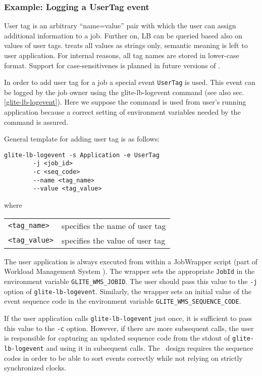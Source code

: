 \subsubsection{Example: Logging a UserTag event}
\label{e:usertag}

User tag is an arbitrary ``name=value'' pair with which the user can assign
additional information to a job. Further on, LB can be queried based also on
values of user tags. \LB treats all values as strings only, semantic meaning
is left to user application. For internal reasons, all tag names are stored 
in lower-case format. Support for case-sensitivenes is planned in future 
versions of \LB.

In order to add user tag for a job a special event \verb'UserTag' is used. This
event can be logged by the job owner using the glite-lb-logevent command (see
also sec.\ref{glite-lb-logevent}). Here we suppose the command is used from
user's running application because a correct setting of environment variables
needed by the command is assured.

General template for adding user tag is as follows:

\begin{verbatim}
glite-lb-logevent -s Application -e UserTag    
        -j <job_id>                         
        -c <seq_code>                       
        --name <tag_name>                   
        --value <tag_value>
\end{verbatim}

where

\begin{tabularx}{\textwidth}{lX}
\texttt{<tag\_name>}  & specifies the name of user tag \\
\texttt{<tag\_value>} & specifies the value of user tag \\
\end{tabularx}

The user application is always executed from within a JobWrapper script (part
of Workload Management System \cite{jgc}). The wrapper  sets the  appropriate
\verb'JobId' in the environment variable \verb'GLITE_WMS_JOBID'. The user
should pass this value to the \verb'-j' option of \verb'glite-lb-logevent'.
Similarly, the wrapper sets an initial value of the event sequence code in the
environment variable \verb'GLITE_WMS_SEQUENCE_CODE'.

If the user application calls \verb'glite-lb-logevent' just once, it is
sufficient to pass this value to the \verb'-c' option.  However, if there are
more  subsequent calls,  the  user is responsible for capturing an updated
sequence code from the stdout of \verb'glite-lb-logevent' and using it in
subsequent calls. The \LB\ design requires the sequence codes in  order  to be
able to sort events correctly while not relying on strictly synchronized
clocks.

